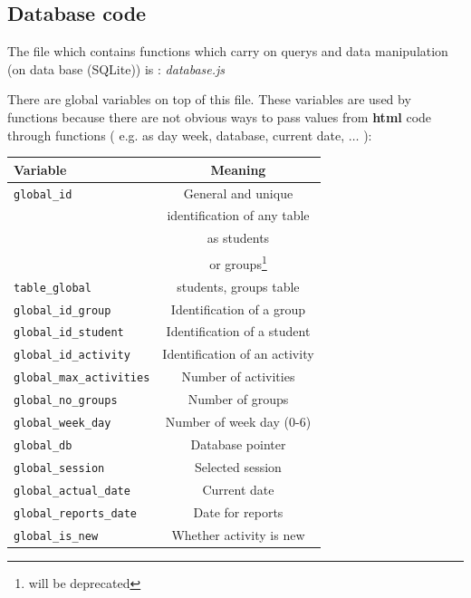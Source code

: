 \begin{bclogo}[couleur=orange!30,logo=\bcbook, arrondi=0.1,ombre=true ]
\begin{tabular}{lll}
\end{tabular}	
\end{bclogo}
	
	
	\subsection{Database code}
  The file which contains functions which carry on querys and data manipulation (on data base (SQLite)) is : \emph{ database.js}

There are  global variables on top of this file. These variables are used by functions because there are not obvious
ways to pass values from {\bf html } code  through functions ( e.g. as day week, database, current date, $\dots$ ):

  
\begin{shadowblock}{13cm}
\begin{tabular}{lc}
{\bf Variable}  & {\bf Meaning } \\
  \hline
  \texttt{global\_id}  & General and unique \\
                       & identification of any table   \\
                       & as students  \\                       
                       & or groups\footnote{will be deprecated} \\
\texttt{table\_global} & students, groups table\\

\texttt{global\_id\_group} &  Identification of a group \\
\texttt{global\_id\_student } &  Identification of a student \\
\texttt{global\_id\_activity} &  Identification of an activity  \\
\texttt{global\_max\_activities}& Number of activities \\
\texttt{global\_no\_groups} & Number of groups\\
\texttt{global\_week\_day} & Number of week day (0-6) \\
\texttt{global\_db }& Database pointer \\
\texttt{global\_session} &  Selected session \\
\texttt{global\_actual\_date} & Current date \\
\texttt{global\_reports\_date} & Date for reports\\

\texttt{global\_is\_new} & Whether activity is new \\


\end{tabular}
\end{shadowblock}
